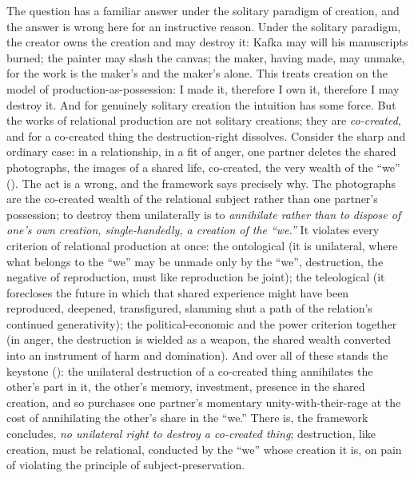 The question has a familiar answer under the solitary paradigm of creation, and the answer is wrong here for an instructive reason. Under the solitary paradigm, the creator owns the creation and may destroy it: Kafka may will his manuscripts burned; the painter may slash the canvas; the maker, having made, may unmake, for the work is the maker's and the maker's alone. This treats creation on the model of production-as-possession: I made it, therefore I own it, therefore I may destroy it. And for genuinely solitary creation the intuition has some force. But the works of relational production are not solitary creations; they are \emph{co-created}, and for a co-created thing the destruction-right dissolves. Consider the sharp and ordinary case: in a relationship, in a fit of anger, one partner deletes the shared photographs, the images of a shared life, co-created, the very wealth of the ``we'' (). The act is a wrong, and the framework says precisely why. The photographs are the co-created wealth of the relational subject rather than one partner's possession; to destroy them unilaterally is to \emph{annihilate rather than to dispose of one's own creation, single-handedly, a creation of the ``we.''} It violates every criterion of relational production at once: the ontological (it is unilateral, where what belongs to the ``we'' may be unmade only by the ``we'', destruction, the negative of reproduction, must like reproduction be joint); the teleological (it forecloses the future in which that shared experience might have been reproduced, deepened, transfigured, slamming shut a path of the relation's continued generativity); the political-economic and the power criterion together (in anger, the destruction is wielded as a weapon, the shared wealth converted into an instrument of harm and domination). And over all of these stands the keystone (): the unilateral destruction of a co-created thing annihilates the other's part in it, the other's memory, investment, presence in the shared creation, and so purchases one partner's momentary unity-with-their-rage at the cost of annihilating the other's share in the ``we.'' There is, the framework concludes, \emph{no unilateral right to destroy a co-created thing}; destruction, like creation, must be relational, conducted by the ``we'' whose creation it is, on pain of violating the principle of subject-preservation.

